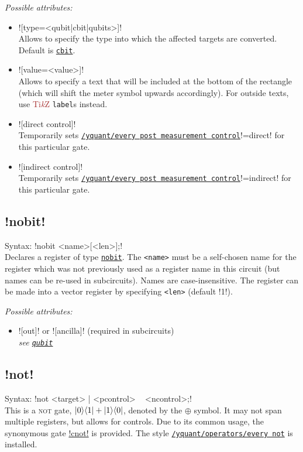 \documentclass{scrartcl}
\def\TikZ{\textcolor{brown}{Ti\textit kZ}}
\def\gate#1{\hyperref[gate:#1]{\texttt{#1}}}
\def\style#1{\hyperref[style:#1]{\texttt{#1}}}
\def\ketbra#1#2{\ket{#1}\!\bra{#2}}
\begin{document}
         \emph{Possible attributes:}
         \begin{itemize}
            \item \yquant![type=<qubit|cbit|qubits>]! \\
               Allows to specify the type into which the affected targets are converted.
               Default is \gate{cbit}.
            \item \yquant![value=<value>]! \\
               Allows to specify a text that will be included at the bottom of the rectangle (which will shift the meter symbol upwards accordingly).
               For outside texts, use \TikZ{} \texttt{label}s instead.
            \item \yquant![direct control]! \\
               Temporarily sets \style{/yquant/every post measurement control}\tex!=direct! for this particular gate.
            \item \yquant![indirect control]! \\
               Temporarily sets \style{/yquant/every post measurement control}\tex!=indirect! for this particular gate.
         \end{itemize}

      \subsection{\texorpdfstring{\yquant!nobit!}{nobit}}\label{gate:nobit}
         Syntax: \yquant!nobit <name>[<len>];! \\
         Declares a register of type \gate{nobit}.
         The \texttt{<name>} must be a self\hyp chosen name for the register which was not previously used as a register name in this circuit (but names can be re\hyp used in subcircuits).
         Names are case\hyp insensitive.
         The register can be made into a vector register by specifying \texttt{<len>} (default \tex!1!).

         \emph{Possible attributes:}
         \begin{itemize}
            \item {}\yquant![out]! or \yquant![ancilla]! (required in subcircuits) \\
               \emph{see \gate{qubit}}
         \end{itemize}

      \subsection{\texorpdfstring{\yquant!not!}{not}}\label{gate:not}
         Syntax: \yquant!not <target> | <pcontrol> ~ <ncontrol>;! \\
         This is a \textsc{not} gate, $\ketbra01 + \ketbra10$, denoted by the $\oplus$ symbol.
         It may not span multiple registers, but allows for controls.
         Due to its common usage, the synonymous gate \hyperref[gate:cnot]{\yquant!cnot!} is provided.
         The style \style{/yquant/operators/every not} is installed.
\end{document}
